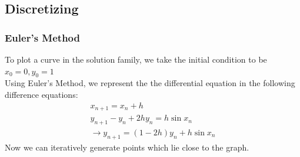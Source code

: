 \documentclass{beamer}
\providecommand{\brak}[1]{\ensuremath{\left(#1\right)}}
\theoremstyle{remark}
\providecommand{\norm}[1]{\lVert#1\rVert}
\newcommand{\myvec}[1]{\ensuremath{\begin{pmatrix}#1\end{pmatrix}}}
\let\vec\mathbf
\numberwithin{equation}{section}
\begin{document}
\subsection{Discretizing}
\begin{frame}
\frametitle{Euler's Method}
To plot a curve in the solution family, we take the initial condition to be\\
$x_0 = 0, y_0 = 1$\\
Using Euler's Method, we represent the the differential equation in the following difference equations:
\begin{align}
    x_{n+1} = x_n + h\\
    y_{n+1} - y_n + 2hy_n  = h\sin x_n\\
    \xrightarrow{} y_{n+1} = \brak{1-2h}y_n + h\sin x_n
\end{align}
Now we can iteratively generate points which lie close to the graph.\\

\end{frame}
\end{document}
